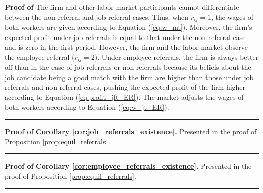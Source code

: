 \documentclass[12pt]{article}
\newenvironment{proof}[1][Proof of]{\noindent\textbf{#1} }{\ \rule{0.5em}{0.5em}}
\begin{document}
\begin{proof}
    The firm and other labor market participants cannot differentiate between the non-referral and job referral cases. Thus, when \(r_{ij} = 1\), the wages of both workers are given according to Equation (\ref{eq:w_mt}). Moreover, the firm's expected profit under job referrals is equal to that under the non-referral case and is zero in the first period. However, the firm and the labor market observe the employee referral (\(r_{ij} = 2\)). Under employee referrals, the firm is always better off than in the case of job referrals or non-referrals because its beliefs about the job candidate being a good match with the firm are higher than those under job referrals and non-referral cases, pushing the expected profit of the firm higher according to Equation (\ref{eq:profit_jft_ER}). The market adjusts the wages of both workers according to Equation (\ref{eq:w_jt_ER}).
\end{proof}

\begin{proof}
    \textbf{Corollary \ref{cor:job_referrals_existence}.}
    Presented in the proof of Proposition \ref{prop:equil_referrals}.
\end{proof}

\begin{proof}
    \textbf{Corollary \ref{cor:employee_referrals_existence}.}
    Presented in the proof of Proposition \ref{prop:equil_referrals}.
\end{proof}
\end{document}
